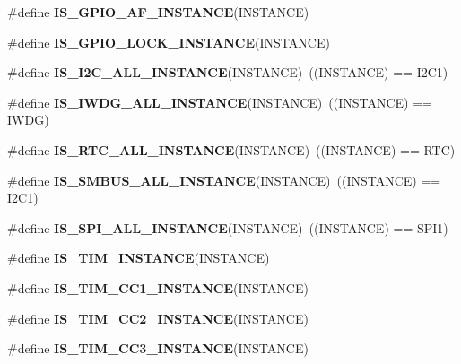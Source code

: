 \begin{DoxyCompactItemize}
\item 
\#define {\bfseries I\+S\+\_\+\+G\+P\+I\+O\+\_\+\+A\+F\+\_\+\+I\+N\+S\+T\+A\+N\+CE}(I\+N\+S\+T\+A\+N\+CE)
\item 
\#define {\bfseries I\+S\+\_\+\+G\+P\+I\+O\+\_\+\+L\+O\+C\+K\+\_\+\+I\+N\+S\+T\+A\+N\+CE}(I\+N\+S\+T\+A\+N\+CE)
\item 
\mbox{\label{group___exported__macro_gacdf0149a4e8c41a6814c13613c38a6b2}} 
\#define {\bfseries I\+S\+\_\+\+I2\+C\+\_\+\+A\+L\+L\+\_\+\+I\+N\+S\+T\+A\+N\+CE}(I\+N\+S\+T\+A\+N\+CE)~((I\+N\+S\+T\+A\+N\+CE) == I2\+C1)
\item 
\mbox{\label{group___exported__macro_gad9ec4c52f0572ee67d043e006f1d5e39}} 
\#define {\bfseries I\+S\+\_\+\+I\+W\+D\+G\+\_\+\+A\+L\+L\+\_\+\+I\+N\+S\+T\+A\+N\+CE}(I\+N\+S\+T\+A\+N\+CE)~((I\+N\+S\+T\+A\+N\+CE) == I\+W\+DG)
\item 
\mbox{\label{group___exported__macro_gab4230e8bd4d88adc4250f041d67375ce}} 
\#define {\bfseries I\+S\+\_\+\+R\+T\+C\+\_\+\+A\+L\+L\+\_\+\+I\+N\+S\+T\+A\+N\+CE}(I\+N\+S\+T\+A\+N\+CE)~((I\+N\+S\+T\+A\+N\+CE) == R\+TC)
\item 
\mbox{\label{group___exported__macro_gaf492fcfe71eab8d1dadf4d837b840af6}} 
\#define {\bfseries I\+S\+\_\+\+S\+M\+B\+U\+S\+\_\+\+A\+L\+L\+\_\+\+I\+N\+S\+T\+A\+N\+CE}(I\+N\+S\+T\+A\+N\+CE)~((I\+N\+S\+T\+A\+N\+CE) == I2\+C1)
\item 
\mbox{\label{group___exported__macro_ga59c7619a86c03df3ebeb4bd8aaef982c}} 
\#define {\bfseries I\+S\+\_\+\+S\+P\+I\+\_\+\+A\+L\+L\+\_\+\+I\+N\+S\+T\+A\+N\+CE}(I\+N\+S\+T\+A\+N\+CE)~((I\+N\+S\+T\+A\+N\+CE) == S\+P\+I1)
\item 
\#define {\bfseries I\+S\+\_\+\+T\+I\+M\+\_\+\+I\+N\+S\+T\+A\+N\+CE}(I\+N\+S\+T\+A\+N\+CE)
\item 
\#define {\bfseries I\+S\+\_\+\+T\+I\+M\+\_\+\+C\+C1\+\_\+\+I\+N\+S\+T\+A\+N\+CE}(I\+N\+S\+T\+A\+N\+CE)
\item 
\#define {\bfseries I\+S\+\_\+\+T\+I\+M\+\_\+\+C\+C2\+\_\+\+I\+N\+S\+T\+A\+N\+CE}(I\+N\+S\+T\+A\+N\+CE)
\item 
\#define {\bfseries I\+S\+\_\+\+T\+I\+M\+\_\+\+C\+C3\+\_\+\+I\+N\+S\+T\+A\+N\+CE}(I\+N\+S\+T\+A\+N\+CE)
\item 

\end{DoxyCompactItemize}
